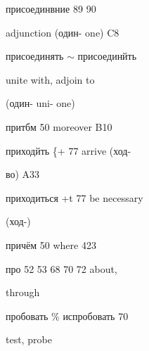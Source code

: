\begin{minipage}[t]{0.475\textwidth}
\noindent присоединвние 89 90\par
\noindent adjunction (один- one) C8\par
\noindent присоединять $\sim$ присоединйть\par
{} unite with, adjoin to\par
\noindent (один- uni- one)\par
\noindent притбм 50 moreover B10\par
\noindent приходйть \{+ 77 arrive (ход-\par
\noindent во) A33\par
\noindent приходиться +t 77 be necessary\par
\noindent (ход-)\par
\noindent причём 50 where 423\par
\noindent про 52 53 68 70 72 about,\par
\noindent through\par
\noindent пробовать \% испробовать 70\par
\noindent test, probe\par
\end{minipage}\hfill
